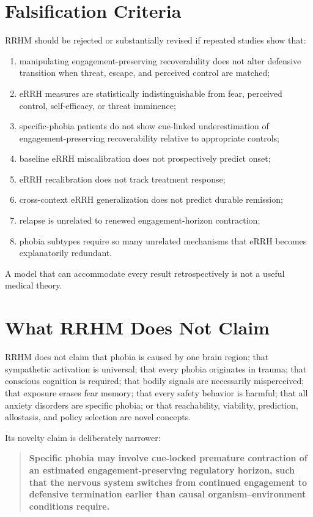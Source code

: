 \documentclass[11pt]{article}
\begin{document}
\section{Falsification Criteria}

RRHM should be rejected or substantially revised if repeated studies show that:

\begin{enumerate}[leftmargin=*]
\item manipulating engagement-preserving recoverability does not alter defensive transition when threat, escape, and perceived control are matched;
\item eRRH measures are statistically indistinguishable from fear, perceived control, self-efficacy, or threat imminence;
\item specific-phobia patients do not show cue-linked underestimation of engagement-preserving recoverability relative to appropriate controls;
\item baseline eRRH miscalibration does not prospectively predict onset;
\item eRRH recalibration does not track treatment response;
\item cross-context eRRH generalization does not predict durable remission;
\item relapse is unrelated to renewed engagement-horizon contraction;
\item phobia subtypes require so many unrelated mechanisms that eRRH becomes explanatorily redundant.
\end{enumerate}

A model that can accommodate every result retrospectively is not a useful medical theory.

\section{What RRHM Does Not Claim}

RRHM does not claim that phobia is caused by one brain region; that sympathetic activation is universal; that every phobia originates in trauma; that conscious cognition is required; that bodily signals are necessarily misperceived; that exposure erases fear memory; that every safety behavior is harmful; that all anxiety disorders are specific phobia; or that reachability, viability, prediction, allostasis, and policy selection are novel concepts.

Its novelty claim is deliberately narrower:

\begin{quote}
\textbf{Specific phobia may involve cue-locked premature contraction of an estimated engagement-preserving regulatory horizon, such that the nervous system switches from continued engagement to defensive termination earlier than causal organism--environment conditions require.}
\end{quote}
\end{document}
